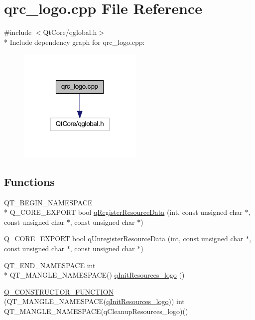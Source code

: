 \hypertarget{a00041}{\section{qrc\+\_\+logo.\+cpp File Reference}
\label{a00041}
}
{\ttfamily \#include $<$Qt\+Core/qglobal.\+h$>$}\\*
Include dependency graph for qrc\+\_\+logo.\+cpp\+:
\nopagebreak
\begin{figure}[H]
\begin{center}
\leavevmode
\includegraphics[width=169pt]{d3/d2a/a00195}
\end{center}
\end{figure}
\subsection*{Functions}
\begin{DoxyCompactItemize}
\item 
Q\+T\+\_\+\+B\+E\+G\+I\+N\+\_\+\+N\+A\+M\+E\+S\+P\+A\+C\+E \\*
Q\+\_\+\+C\+O\+R\+E\+\_\+\+E\+X\+P\+O\+R\+T bool \hyperlink{a00041_ab3bec3d1e679084be46edc41e4c91bc1}{q\+Register\+Resource\+Data} (int, const unsigned char $\ast$, const unsigned char $\ast$, const unsigned char $\ast$)
\item 
Q\+\_\+\+C\+O\+R\+E\+\_\+\+E\+X\+P\+O\+R\+T bool \hyperlink{a00041_ad65f8bca8010dd1fd135a28a085c6d03}{q\+Unregister\+Resource\+Data} (int, const unsigned char $\ast$, const unsigned char $\ast$, const unsigned char $\ast$)
\item 
Q\+T\+\_\+\+E\+N\+D\+\_\+\+N\+A\+M\+E\+S\+P\+A\+C\+E int \\*
Q\+T\+\_\+\+M\+A\+N\+G\+L\+E\+\_\+\+N\+A\+M\+E\+S\+P\+A\+C\+E() \hyperlink{a00041_a26f25d34489dcef5b740853d8506af1c}{q\+Init\+Resources\+\_\+logo} ()
\item 
\hyperlink{a00041_ae1f71e8cee42447be2c10a353b147b74}{Q\+\_\+\+C\+O\+N\+S\+T\+R\+U\+C\+T\+O\+R\+\_\+\+F\+U\+N\+C\+T\+I\+O\+N} (Q\+T\+\_\+\+M\+A\+N\+G\+L\+E\+\_\+\+N\+A\+M\+E\+S\+P\+A\+C\+E(\hyperlink{a00041_a26f25d34489dcef5b740853d8506af1c}{q\+Init\+Resources\+\_\+logo})) int Q\+T\+\_\+\+M\+A\+N\+G\+L\+E\+\_\+\+N\+A\+M\+E\+S\+P\+A\+C\+E(q\+Cleanup\+Resources\+\_\+logo)()
\end{DoxyCompactItemize}


